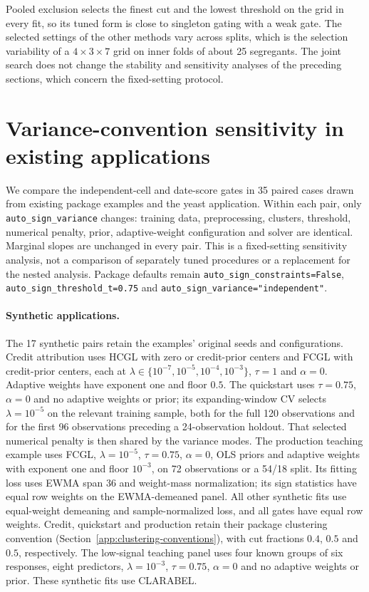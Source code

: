 \documentclass[11pt,a4paper]{article}
\begin{document}
Pooled exclusion selects the finest cut and the lowest threshold on the grid
in every fit, so its tuned form is close to singleton gating with a weak gate.
The selected settings of the other methods vary across splits, which is the
selection variability of a $4\times3\times7$ grid on inner folds of about 25
segregants. The joint search does not change the stability and sensitivity
analyses of the preceding sections, which concern the fixed-setting protocol.

\FloatBarrier

\section{Variance-convention sensitivity in existing applications}\label{app:variance-sensitivity}

We compare the independent-cell and date-score gates in 35 paired cases drawn
from existing package examples and the yeast application. Within each pair,
only \texttt{auto\_sign\_variance} changes: training data, preprocessing,
clusters, threshold, numerical penalty, prior, adaptive-weight configuration
and solver are identical. Marginal slopes are unchanged in every pair.
This is a fixed-setting sensitivity analysis, not a comparison of separately
tuned procedures or a replacement for the nested analysis. Package defaults
remain \texttt{auto\_sign\_constraints=False},
\texttt{auto\_sign\_threshold\_t=0.75} and
\texttt{auto\_sign\_variance="independent"}.

\paragraph{Synthetic applications.}
The 17 synthetic pairs retain the examples' original seeds and configurations.
Credit attribution uses HCGL with zero or credit-prior centers and FCGL with
credit-prior centers, each at $\lambda\in\{10^{-7},10^{-5},10^{-4},10^{-3}\}$,
$\tau=1$ and $\alpha=0$. Adaptive weights have exponent one and floor $0.5$.
The quickstart uses $\tau=0.75$, $\alpha=0$ and no adaptive weights or prior;
its expanding-window CV selects $\lambda=10^{-5}$ on the relevant training
sample, both for the full 120 observations and for the first 96 observations
preceding a 24-observation holdout. That selected numerical penalty is then
shared by the variance modes. The production teaching example uses FCGL,
$\lambda=10^{-5}$, $\tau=0.75$, $\alpha=0$, OLS priors and adaptive weights
with exponent one and floor $10^{-3}$, on 72 observations or a 54/18 split.
Its fitting loss uses EWMA span 36 and weight-mass normalization; its sign
statistics have equal row weights on the EWMA-demeaned panel. All other
synthetic fits use equal-weight demeaning and sample-normalized loss, and
all gates have equal row weights. Credit, quickstart and production retain
their package clustering convention (Section~\ref{app:clustering-conventions}),
with cut fractions $0.4$, $0.5$ and $0.5$, respectively. The low-signal
teaching panel uses four known groups of six responses, eight predictors,
$\lambda=10^{-3}$, $\tau=0.75$, $\alpha=0$ and no adaptive weights or prior.
These synthetic fits use CLARABEL.
\end{document}
